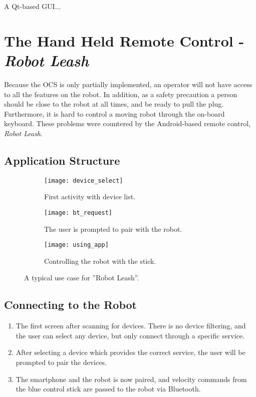 A Qt-based \ac{GUI}...

\section{The Hand Held Remote Control - \textit{Robot Leash}}

Because the \ac{OCS} is only partially implemented, an operator will not have access to all the features on the robot. In addition, as a safety precaution a person should be close to the robot at all times, and be ready to pull the plug. Furthermore, it is hard to control a moving robot through the on-board keyboard. These problems were countered by the Android-based remote control, \textit{Robot Leash}. 

\subsection{Application Structure}


\begin{figure}
	\centering
	\begin{subfigure}[b]{0.30\textwidth}
		\texttt{[image: device\_select]}
		\caption{First activity with device list.}
		\label{fig:device_select}
	\end{subfigure}
		\begin{subfigure}[b]{0.30\textwidth}
			\texttt{[image: bt\_request]}
			\caption{The user is prompted to pair with the robot.}
			\label{fig:bt_request}
		\end{subfigure}
	\begin{subfigure}[b]{0.30\textwidth}
		\texttt{[image: using\_app]}
		\caption{Controlling the robot with the stick.}
		\label{fig:using_app}
	\end{subfigure}
	\caption{\label{fig:app_screens}A typical use case for ''Robot Leash''.}
\end{figure}

\subsection{Connecting to the Robot}

\begin{enumerate}
	\item The first screen after scanning for devices. There is no device filtering, and the user can select any device, but only connect through a specific service.
	\item After selecting a device which provides the correct service, the user will be prompted to pair the devices.
	\item The smartphone and the robot is now paired, and velocity commands from the blue control stick are passed to the robot via Bluetooth.
\end{enumerate}

